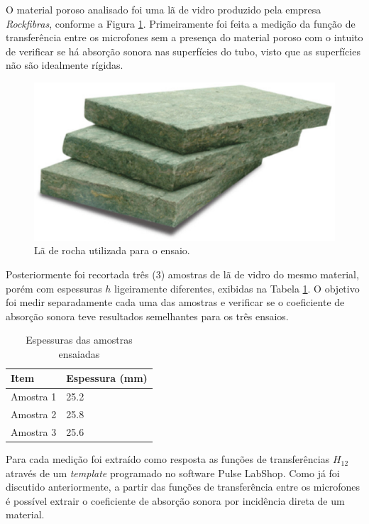 O material poroso analisado foi uma lã de vidro produzido pela empresa \textit{Rockfibras}, conforme a Figura \ref{fig.rockfibras}. Primeiramente foi feita a medição da função de transferência entre os microfones sem a presença do material poroso com o intuito de verificar se há absorção sonora nas superfícies do tubo, visto que as superfícies não são idealmente rígidas.
\begin{figure}[h]
\centering
\includegraphics[scale=0.35]{figs/rockfibras.eps}
\caption{Lã de rocha utilizada para o ensaio.}
\label{fig.rockfibras}
\end{figure}



Posteriormente foi recortada três (3) amostras de lã de vidro do mesmo material, porém com espessuras $h$ ligeiramente diferentes, exibidas na Tabela \ref{tab.espessuras}. O objetivo foi medir separadamente cada uma das amostras e verificar se o coeficiente de absorção sonora teve resultados semelhantes para os três ensaios.

\begin{table}[h]
\centering
\caption{Espessuras das amostras ensaiadas}
\label{tab.espessuras}
\begin{tabular}{l|l}
Item                       & Espessura (mm)      \\ \hline
Amostra 1                  & 25.2                  \\
Amostra 2                  & 25.8               \\
Amostra 3                  & 25.6                  \\
\end{tabular}
\end{table}

Para cada medição foi extraído como resposta as funções de transferências $H_{12}$ através de um \textit{template} programado no software Pulse LabShop. Como já foi discutido anteriormente, a partir das funções de transferência entre os microfones é possível extrair o coeficiente de absorção sonora por incidência direta de um material.


